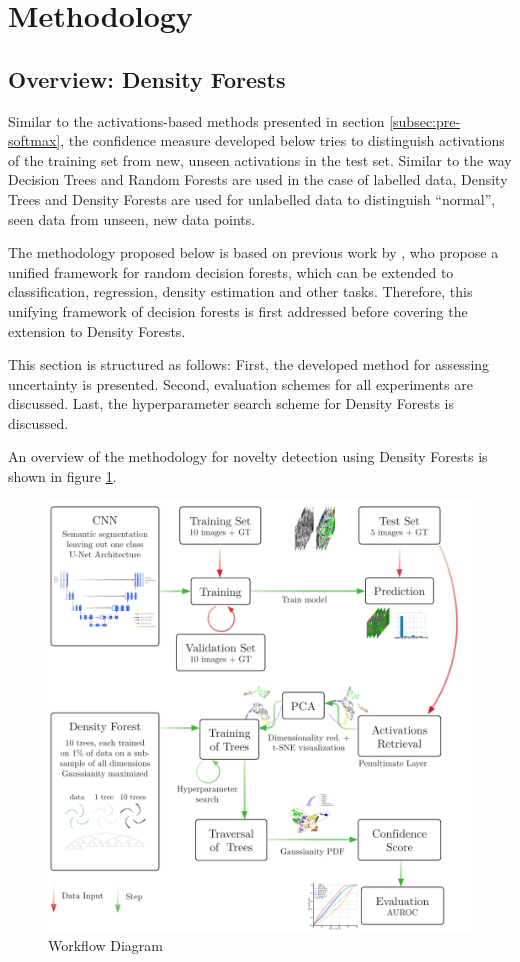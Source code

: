 \documentclass[10pt]{article}
\begin{document}
\section{Methodology}

\subsection{Overview: Density Forests}
Similar to the activations-based methods presented in section \ref{subsec:pre-softmax}, the confidence measure developed below tries to distinguish activations of the training set from new, unseen activations in the test set. Similar to the way Decision Trees and Random Forests are used in the case of labelled data, Density Trees and Density Forests are used for unlabelled data to distinguish ``normal'', seen data from unseen, new data points.

The methodology proposed below is based on previous work by \textcite{decisionForests-MSR}, who propose a unified framework for random decision forests, which can be extended to classification, regression, density estimation and other tasks. Therefore, this unifying framework of decision forests is first addressed before covering the extension to Density Forests.

This section is structured as follows: First, the developed method for assessing uncertainty is presented. Second, evaluation schemes for all experiments are discussed. Last, the hyperparameter search scheme for Density Forests is discussed.

An overview of the methodology for novelty detection using Density Forests is shown in figure \ref{fig:schema}.

\begin{figure}[H]
    \centering
    \includegraphics[width=\textwidth]{schema_df}
    \caption{Workflow Diagram}
    \label{fig:schema}
\end{figure}
\end{document}
